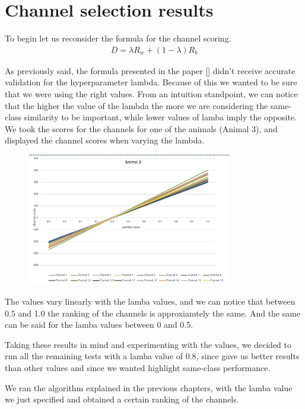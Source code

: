 \documentclass{Configuration_Files/PoliMi3i_thesis}
\begin{document}
\section{Channel selection results}

To begin let us reconsider the formula for the channel scoring.
\begin{align}
	D = \lambda R_w + (1-\lambda)R_b
   \label{eq:XCDC6}
\end{align}

As previously said, the formula presented in the paper []
didn't receive accurate validation for the hyperparameter lambda.
Because of this we wanted to be sure that we were using the right values.
From an intuition standpoint, we can notice that the higher the value of the lambda the more we are considering the same-class similarity to be important, while lower values of lamba imply the opposite.
We took the scores for the channels for one of the animals (Animal 3), and displayed the channel scores when varying the lambda.

\begin{figure}[H]
    \centering
    \includegraphics[width=0.8\textwidth]{Results Matteo/figure1}
    \label{fig:figure1}
\end{figure}

The values vary linearly with the lamba values, and we can notice that between 0.5 and 1.0 the ranking of the channels is approxiamtely the same.
And the same can be said for the lamba values between 0 and 0.5.

Taking these results in mind and experimenting with the values, we decided to run all the remaining tests with a lamba value of 0.8, since gave us better results than other values and since we wanted highlight same-class performance.

We ran the algorithm explained in the previous chapters, with the lamba value we just specified and obtained a certain ranking of the channels.
\end{document}
